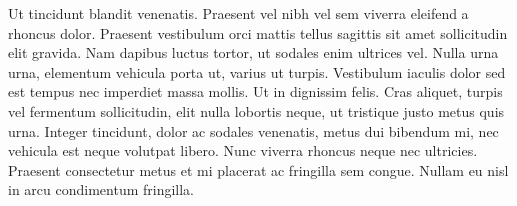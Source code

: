 Ut tincidunt blandit venenatis. Praesent vel nibh vel sem viverra eleifend a rhoncus dolor. Praesent vestibulum orci mattis tellus sagittis sit amet sollicitudin elit gravida. Nam dapibus luctus tortor, ut sodales enim ultrices vel. Nulla urna urna, elementum vehicula porta ut, varius ut turpis. Vestibulum iaculis dolor sed est tempus nec imperdiet massa mollis. Ut in dignissim felis. Cras aliquet, turpis vel fermentum sollicitudin, elit nulla lobortis neque, ut tristique justo metus quis urna. Integer tincidunt, dolor ac sodales venenatis, metus dui bibendum mi, nec vehicula est neque volutpat libero. Nunc viverra rhoncus neque nec ultricies. Praesent consectetur metus et mi placerat ac fringilla sem congue. Nullam eu nisl in arcu condimentum fringilla. 